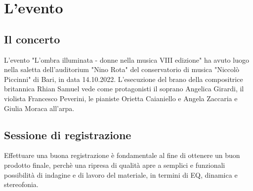 \newcommand{\mylanguages}{italian} %
\newcommand{\mytitle}{Limiti elettroacustici}
\newcommand{\mysubtitle}{Un approccio per rappresentare al meglio una fonte sonora}
\newcommand{\authorone}{Giancarlo Bottalico}
\newcommand{\institutione}{Conservatorio di musica "N. Piccinni", Bari}
\newcommand{\emailone}{giancarlobottalico@gmail.com}


	\maketitle
	\thispagestyle{empty}

\section{L'evento}

	\subsection{Il concerto}
	L'evento "L'ombra illuminata - donne nella musica VIII edizione" ha avuto luogo nella saletta dell'auditorium "Nino Rota" del conservatorio di musica "Niccolò Piccinni" di Bari, in data 14.10.2022. L'esecuzione del brano della compositrice britannica Rhian Samuel vede come protagonisti il soprano Angelica Girardi, il violista Francesco Peverini, le pianiste Orietta Caianiello e Angela Zaccaria e Giulia Moraca all'arpa.
	
	\subsection{Sessione di registrazione}
	Effettuare una buona registrazione è fondamentale al fine di ottenere un buon prodotto finale, perchè una ripresa di qualità apre a semplici e funzionali possibilità di indagine e di lavoro del materiale, in termini di EQ, dinamica e stereofonia.
	
